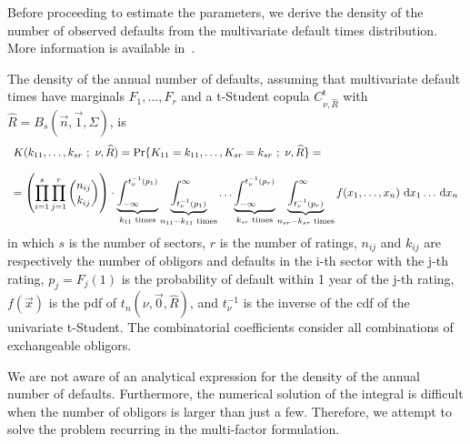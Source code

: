 \documentclass[11pt,fleqn]{book} %
\begin{document}
Before proceeding to estimate the parameters, we derive the density of the 
number of observed defaults from the multivariate default times distribution. 
More information is available in~\cite{schonbucher:2000,gordy:2002,roncalli:2004}.

\begin{proposition}
	The density of the annual number of defaults, assuming that multivariate 
	default times have marginals $F_1,\dots,F_r$ and a t-Student copula 
	$C_{\nu,\widehat{R}}^{\text{t}}$ with 
	$\widehat{R} = B_s(\vec{n},\vec{1},\Sigma)$, is
	\begin{displaymath}
		\begin{array}{l}
			K(k_{11},\dots,k_{sr}\ ;\ \nu, \widehat{R}) = 
			\Pr\{K_{11}=k_{11},\dots,K_{sr}=k_{sr}\ ;\ \nu, \widehat{R}\} = \\
			\\
			= \left( \displaystyle \prod_{i=1}^s \prod_{j=1}^r \binom{n_{ij}}{k_{ij}} \right) \cdot
			\displaystyle
			\underbrace{\int_{-\infty}^{t_{\nu}^{-1}(p_1)}}_{k_{11} \text{ times}}
			\underbrace{\int_{t_{\nu}^{-1}(p_1)}^{\infty}}_{n_{11}-k_{11} \text{ times}}
			\dots
			\underbrace{\int_{-\infty}^{t_{\nu}^{-1}(p_r)}}_{k_{sr} \text{ times}}
			\underbrace{\int_{t_{\nu}^{-1}(p_r)}^{\infty}}_{n_{sr}-k_{sr} \text{ times}}
			f(x_1,\dots,x_n) \mathop{\,\mathrm{{}d}}\mathopen{} x_1 \dots \mathop{\,\mathrm{{}d}}\mathopen{} x_n
		\end{array}
	\end{displaymath}
	in which $s$ is the number of sectors, $r$ is the number of ratings,
	$n_{ij}$ and $k_{ij}$ are respectively the number of obligors and 
	defaults in the i-th sector with the j-th rating, $p_j = F_j(1)$ is the 
	probability of default within 1 year of the j-th rating, $f(\vec{x})$ 
	is the pdf of $t_n(\nu,\vec{0},\widehat{R})$, and $t_{\nu}^{-1}$ is the 
	inverse of the cdf of the univariate t-Student. The combinatorial 
	coefficients consider all combinations of exchangeable obligors.
\end{proposition}

We are not aware of an analytical expression for the density of the annual 
number of defaults. Furthermore, the numerical solution of the integral is 
difficult when the number of obligors is larger than just a few. Therefore,
we attempt to solve the problem recurring in the multi-factor formulation. 
\end{document}
